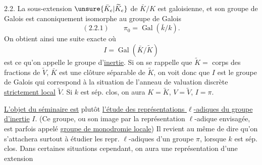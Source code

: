 
2.2. La sous-extension $\unsure{\bar K_e|\widetilde K_e}$ de $\bar K/K$ est galoisienne, et son groupe de Galois est canoniquement isomorphe au groupe de Galois
\[
(2.2.1)\qquad\pi_0=\operatorname{Gal}(\bar k/k).
\]
On obtient ainsi une suite exacte
où
\[
 I=\operatorname{Gal}(\bar K/\widetilde K)
\]
est ce qu'on appelle le groupe d'\uline{inertie}.   Si on se rappelle que $\widetilde K=$ corps des fractions de $\widetilde V$,  $\bar K$ est une clôture séparable de $\widetilde K$, on voit donc que $I$ est le groupe de Galois qui correspond à la situation  de l'anneau de valuation discrète \uline{strictement local} $\widetilde V$. Si $k$ est sép. clos, on aura $K=\widetilde K$, $V=\widetilde V$, $I=\pi$.

\uline{L'objet du séminaire est} plutôt \uline{l'étude des représentations $\ell$-adiques du groupe d'inertie} $I$. (Ce groupe, ou son image par la représentation $\ell$-adique envisagée,  est parfois appelé \uline{groupe de monodromie locale}) Il revient au même de dire qu'on s'attachera surtout à étudier les repr. $\ell$-adiques d'un groupe $\pi$, lorsque $k$ est sép. clos. Dans certaines situations cependant, on aura une représentation d'une extension
